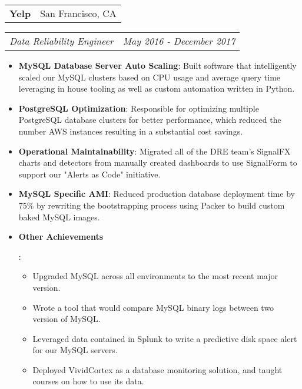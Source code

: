 \documentclass[letterpaper,11pt]{article}
\makeatletter
\newcommand{\resumeItem}[2]{
  \item\small{
    \textbf{#1}{: #2 \vspace{-2pt}}
  }
}
\newcommand{\resumeSubheading}[2]{
  \vspace{-1pt}\item
    \begin{tabular*}{0.97\textwidth}{l@{\extracolsep{\fill}}r}
      \textbf{#1} & #2 \\
    \end{tabular*}
}
\newcommand{\resumeSubtitle}[2]{
  \vspace{-1pt}
    \begin{tabular*}{0.97\textwidth}{l@{\extracolsep{\fill}}r}
      \textit{\small#1} & \textit{\small #2} \\
    \end{tabular*}\vspace{-5pt}
}
\newcommand{\resumeItemListStart}{\begin{itemize}}
\newcommand{\resumeItemListEnd}{\end{itemize}\vspace{-5pt}}
\makeatother
\begin{document}
    \vspace{15pt}
    \resumeSubheading
      {Yelp}{San Francisco, CA}
    \resumeSubtitle
      {Data Reliability Engineer}{May 2016 - December 2017}
      \resumeItemListStart
        \resumeItem{MySQL Database Server Auto Scaling}
          {Built software that intelligently scaled our MySQL clusters based on CPU usage and average query time leveraging in house tooling as well as custom automation written in Python.}
        \resumeItem{PostgreSQL Optimization}
          {Responsible for optimizing multiple PostgreSQL database clusters for better performance, which reduced the number AWS instances resulting in a substantial cost savings.}
        \resumeItem{Operational Maintainability}
          {Migrated all of the DRE team's SignalFX charts and detectors from manually created dashboards to use SignalForm to support our "Alerts as Code" initiative.}
        \resumeItem{MySQL Specific AMI}
          {Reduced production database deployment time by 75\% by rewriting the bootstrapping process using Packer to build custom baked MySQL images.}
        \resumeItem{Other Achievements}
          {
            \begin{itemize}[noitemsep]
            \item Upgraded MySQL across all environments to the most recent major version.
            \item Wrote a tool that would compare MySQL binary logs between two version of MySQL.
            \item Leveraged data contained in Splunk to write a predictive disk space alert for our MySQL servers.
            \item Deployed VividCortex as a database monitoring solution, and taught courses on how to use its data.
            \end{itemize}
          }
      \resumeItemListEnd
\end{document}
